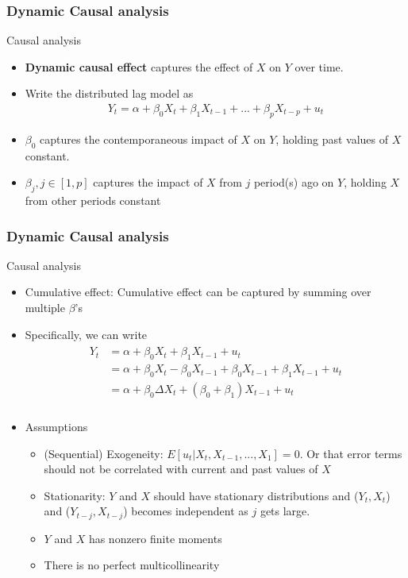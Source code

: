 \begin{frame}
\frametitle{Dynamic Causal analysis}
Causal analysis
\begin{itemize}
\item \textbf{Dynamic causal effect} captures the effect of $X$ on $Y$ over time.
\item Write the distributed lag model as 
\begin{align*}
Y_t = \alpha+\beta_{0}X_t + \beta_{1}X_{t-1}+...+\beta_pX_{t-p}+u_t
\end{align*}
\item $\beta_{0}$ captures the contemporaneous impact of $X$ on $Y$, holding past values of $X$ constant. 
\item $\beta_j , j\in[1,p]$ captures the impact of $X$ from $j$ period(s) ago on $Y$, holding $X$ from other periods constant
\end{itemize}
\end{frame}


\begin{frame}
\frametitle{Dynamic Causal analysis}
Causal analysis
\begin{itemize}
\item Cumulative effect: Cumulative effect can be captured by summing over multiple $\beta$'s
\item Specifically, we can write
\begin{align*}
\begin{aligned}
Y_t& = \alpha+\beta_{0}X_t + \beta_{1}X_{t-1}+u_t\\
&=\alpha +\beta_{0} X_t - \beta_{0}X_{t-1} + \beta_{0} X_{t-1} + \beta_{1} X_{t-1}+u_t \\
&=\alpha + \beta_{0}\Delta X_t + (\beta_{0} + \beta_{1})X_{t-1}+u_t\\
\end{aligned}
\end{align*}
\item Assumptions
\begin{itemize}
\item (Sequential) Exogeneity: $E[u_t|X_t, X_{t-1},...,X_{1}]=0$. Or that error terms should not be correlated with current and past values of $X$
\item Stationarity: $Y$ and $X$ should have stationary distributions and ($Y_t, X_t$) and ($Y_{t-j}, X_{t-j}$) becomes independent as $j$ gets large. 
\item $Y$ and $X$ has nonzero finite moments
\item There is no perfect multicollinearity
\end{itemize}
\end{itemize}
\end{frame}


